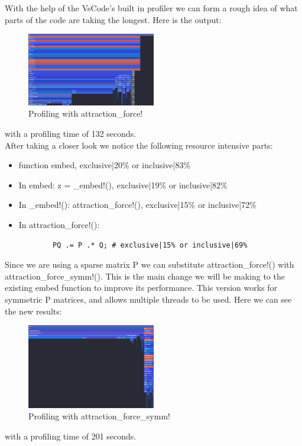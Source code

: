 With the help of the VsCode's built in profiler we can form a rough idea of what parts of the code
are taking the longest. Here is the output:
\begin{figure}[H]
    \includegraphics[width=0.5\textwidth]{media/embedProfiling.png}
    \caption{Profiling with attraction\_force!}
\end{figure}
with a profiling time of 132 seconds. \\

After taking a closer look we notice the following resource intensive parts:
\begin{itemize}
    \item function embed, exclusive|20\% or inclusive|83\% 
    \item In embed: z = \_embed!(), exclusive|19\% or inclusive|82\% 
    \item In \_embed!(): attraction\_force!(), exclusive|15\% or inclusive|72\%
    \item In attraction\_force!(): 
    \begin{verbatim}
        PQ .= P .* Q; # exclusive|15% or inclusive|69%
    \end{verbatim}
\end{itemize}

Since we are using a sparse matrix P we can substitute attraction\_force!() with attraction\_force\_symm!().
This is the main change we will be making to the existing embed function to improve its performance. This
version works for symmetric P matrices, and allows multiple threads to be used. Here we can see the 
new results:
\begin{figure}[H]
    \includegraphics[width=0.5\textwidth]{media/embedProfilingSymm.png}
    \caption{Profiling with attraction\_force\_symm!}
\end{figure}
with a profiling time of 201 seconds. \\

